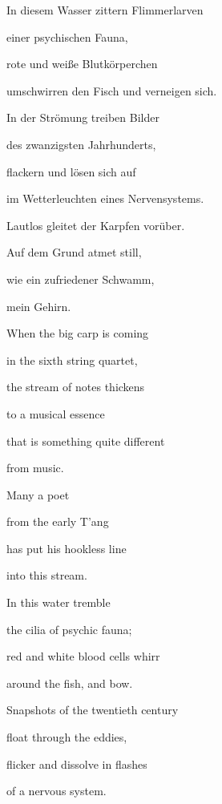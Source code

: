 \bigskip

In diesem Wasser zittern Flimmerlarven

einer psychischen Fauna,

rote und weiße Blutkörperchen

umschwirren den Fisch und verneigen sich.


\bigskip

In der Strömung treiben Bilder

des zwanzigsten Jahrhunderts,

flackern und lösen sich auf

im Wetterleuchten eines Nervensystems.


\bigskip

Lautlos gleitet der Karpfen vorüber.

Auf dem Grund atmet still,

wie ein zufriedener Schwamm, 

mein Gehirn.


\bigskip



\bigskip

When the big carp is coming

in the sixth string quartet,

the stream of notes thickens

to a musical essence


\bigskip

that is something quite different

from music. 


\bigskip

Many a poet

from the early T'ang 

has put his hookless line

into this stream.


\bigskip

In this water tremble

the cilia of psychic fauna;

red and white blood cells whirr

around the fish, and bow.


\bigskip

Snapshots of the twentieth century

float through the eddies,

flicker and dissolve in flashes

of a nervous system.


